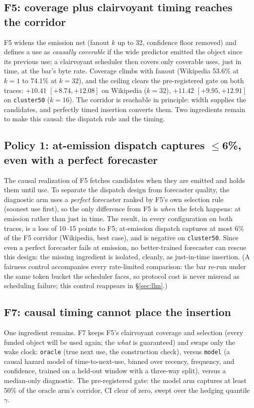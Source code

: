 \documentclass[11pt]{article}
\begin{document}
\subsection{F5: coverage plus clairvoyant timing reaches the corridor}\label{sec:f5}
F5 widens the emission net (fanout $k$ up to 32, confidence floor removed) and defines a use as \emph{causally coverable} if the wide predictor emitted the object since its previous use; a clairvoyant scheduler then covers only coverable uses, just in time, at the bar's byte rate. Coverage climbs with fanout (Wikipedia 53.6\% at $k{=}1$ to 74.1\% at $k{=}32$), and the ceiling clears the pre-registered gate on both traces: $+10.41$ $[+8.74,+12.08]$ on Wikipedia ($k{=}32$), $+11.42$ $[+9.95,+12.91]$ on \texttt{cluster50} ($k{=}16$). The corridor is reachable in principle: width supplies the candidates, and perfectly timed insertion converts them. Two ingredients remain to make this causal: the dispatch rule and the timing.

\subsection{Policy 1: at-emission dispatch captures $\leq$6\%, even with a perfect forecaster}\label{sec:policy1}
The causal realization of F5 fetches candidates when they are emitted and holds them until use. To separate the dispatch design from forecaster quality, the diagnostic arm uses a \emph{perfect} forecaster ranked by F5's own selection rule (soonest use first), so the only difference from F5 is \emph{when} the fetch happens: at emission rather than just in time. The result, in every configuration on both traces, is a loss of 10--15 points to F5; at-emission dispatch captures at most 6\% of the F5 corridor (Wikipedia, best case), and is negative on \texttt{cluster50}. Since even a perfect forecaster fails at emission, no better-trained forecaster can rescue this design: the missing ingredient is isolated, cleanly, as just-in-time insertion. (A fairness control accompanies every rate-limited comparison: the bar re-run under the same token bucket the scheduler faces, so protocol cost is never misread as scheduling failure; this control reappears in \S\ref{sec:llm}.)

\subsection{F7: causal timing cannot place the insertion}\label{sec:f7}
One ingredient remains. F7 keeps F5's clairvoyant coverage and selection (every funded object will be used again; the \emph{what} is guaranteed) and swaps only the wake clock: \texttt{oracle} (true next use, the construction check), versus \texttt{model} (a causal hazard model of time-to-next-use, binned over recency, frequency, and confidence, trained on a held-out window with a three-way split), versus a median-only diagnostic. The pre-registered gate: the model arm captures at least 50\% of the oracle arm's corridor, CI clear of zero, swept over the hedging quantile $\gamma$.
\end{document}
